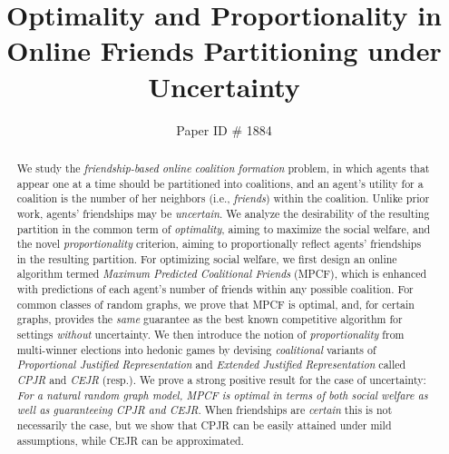 \documentclass[letterpaper]{article} %
\title{Optimality and Proportionality in Online Friends Partitioning under Uncertainty}
\author{Paper ID \# 1884}
\begin{document}
\maketitle

\begin{abstract}
    We study the \textit{friendship-based online coalition formation} problem, in which agents that appear one at a time should be partitioned into coalitions, and an agent's utility for a coalition is the number of her neighbors (i.e., \textit{friends}) within the coalition. Unlike prior work, agents' friendships may be \textit{uncertain}. We analyze the desirability of the resulting partition in the common term of \textit{optimality}, aiming to maximize the social welfare, and the novel \textit{proportionality} criterion, aiming to proportionally reflect agents' friendships in the resulting partition. For optimizing social welfare, we first design an online algorithm termed \textit{Maximum Predicted Coalitional Friends} (MPCF), which is enhanced with predictions of each agent's number of friends within any possible coalition. For common classes of random graphs, we prove that MPCF is optimal, and, for certain graphs, provides the \textit{same} guarantee as the best known competitive algorithm for settings \textit{without} uncertainty. %
    We then introduce the notion of \textit{proportionality} from multi-winner elections into hedonic games by devising \textit{coalitional} variants of \textit{Proportional Justified Representation} and \textit{Extended Justified Representation} called \textit{CPJR} and \textit{CEJR} (resp.). We prove a strong positive result for the case of uncertainty: \textit{For a natural random graph model, MPCF is optimal in terms of both social welfare as well as guaranteeing CPJR and CEJR}. When friendships are \textit{certain} this is not necessarily the case, but we show that CPJR can be easily attained under mild assumptions, while CEJR can be approximated.
\end{abstract}
\end{document}
